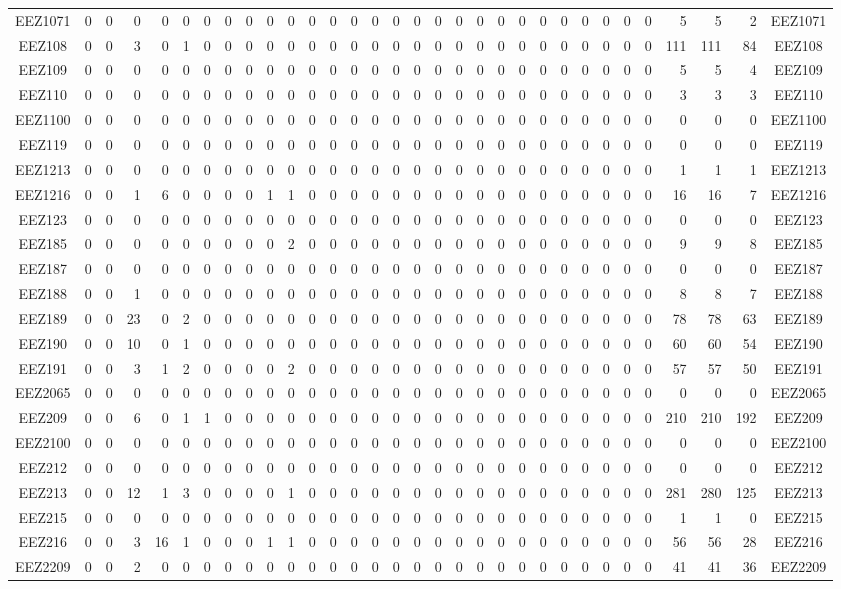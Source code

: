 \documentclass[10pt,a4paper,twoside]{report}
\begin{document}
{\begin{tabular}{crrrrrrrrrrrrrrrrrrrrrrrrrrrrrrc}
EEZ1071&0&0&0&0&0&0&0&0&0&0&0&0&0&0&0&0&0&0&0&0&0&0&0&0&0&0&0&5&5&2&EEZ1071\\
EEZ108&0&0&3&0&1&0&0&0&0&0&0&0&0&0&0&0&0&0&0&0&0&0&0&0&0&0&0&111&111&84&EEZ108\\
EEZ109&0&0&0&0&0&0&0&0&0&0&0&0&0&0&0&0&0&0&0&0&0&0&0&0&0&0&0&5&5&4&EEZ109\\
EEZ110&0&0&0&0&0&0&0&0&0&0&0&0&0&0&0&0&0&0&0&0&0&0&0&0&0&0&0&3&3&3&EEZ110\\
EEZ1100&0&0&0&0&0&0&0&0&0&0&0&0&0&0&0&0&0&0&0&0&0&0&0&0&0&0&0&0&0&0&EEZ1100\\
EEZ119&0&0&0&0&0&0&0&0&0&0&0&0&0&0&0&0&0&0&0&0&0&0&0&0&0&0&0&0&0&0&EEZ119\\
EEZ1213&0&0&0&0&0&0&0&0&0&0&0&0&0&0&0&0&0&0&0&0&0&0&0&0&0&0&0&1&1&1&EEZ1213\\
EEZ1216&0&0&1&6&0&0&0&0&1&1&0&0&0&0&0&0&0&0&0&0&0&0&0&0&0&0&0&16&16&7&EEZ1216\\
EEZ123&0&0&0&0&0&0&0&0&0&0&0&0&0&0&0&0&0&0&0&0&0&0&0&0&0&0&0&0&0&0&EEZ123\\
EEZ185&0&0&0&0&0&0&0&0&0&2&0&0&0&0&0&0&0&0&0&0&0&0&0&0&0&0&0&9&9&8&EEZ185\\
EEZ187&0&0&0&0&0&0&0&0&0&0&0&0&0&0&0&0&0&0&0&0&0&0&0&0&0&0&0&0&0&0&EEZ187\\
EEZ188&0&0&1&0&0&0&0&0&0&0&0&0&0&0&0&0&0&0&0&0&0&0&0&0&0&0&0&8&8&7&EEZ188\\
EEZ189&0&0&23&0&2&0&0&0&0&0&0&0&0&0&0&0&0&0&0&0&0&0&0&0&0&0&0&78&78&63&EEZ189\\
EEZ190&0&0&10&0&1&0&0&0&0&0&0&0&0&0&0&0&0&0&0&0&0&0&0&0&0&0&0&60&60&54&EEZ190\\
EEZ191&0&0&3&1&2&0&0&0&0&2&0&0&0&0&0&0&0&0&0&0&0&0&0&0&0&0&0&57&57&50&EEZ191\\
EEZ2065&0&0&0&0&0&0&0&0&0&0&0&0&0&0&0&0&0&0&0&0&0&0&0&0&0&0&0&0&0&0&EEZ2065\\
EEZ209&0&0&6&0&1&1&0&0&0&0&0&0&0&0&0&0&0&0&0&0&0&0&0&0&0&0&0&210&210&192&EEZ209\\
EEZ2100&0&0&0&0&0&0&0&0&0&0&0&0&0&0&0&0&0&0&0&0&0&0&0&0&0&0&0&0&0&0&EEZ2100\\
EEZ212&0&0&0&0&0&0&0&0&0&0&0&0&0&0&0&0&0&0&0&0&0&0&0&0&0&0&0&0&0&0&EEZ212\\
EEZ213&0&0&12&1&3&0&0&0&0&1&0&0&0&0&0&0&0&0&0&0&0&0&0&0&0&0&0&281&280&125&EEZ213\\
EEZ215&0&0&0&0&0&0&0&0&0&0&0&0&0&0&0&0&0&0&0&0&0&0&0&0&0&0&0&1&1&0&EEZ215\\
EEZ216&0&0&3&16&1&0&0&0&1&1&0&0&0&0&0&0&0&0&0&0&0&0&0&0&0&0&0&56&56&28&EEZ216\\
EEZ2209&0&0&2&0&0&0&0&0&0&0&0&0&0&0&0&0&0&0&0&0&0&0&0&0&0&0&0&41&41&36&EEZ2209\\

\end{tabular}}
\end{document}
